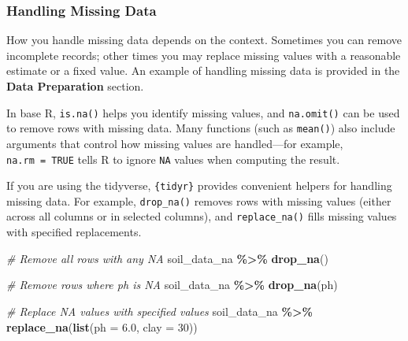 \documentclass[
  10pt,
  b5paper,
  oneside]{book}
\newenvironment{Shaded}{\begin{snugshade}}{\end{snugshade}}
\newcommand{\AttributeTok}[1]{\textcolor[rgb]{0.13,0.29,0.53}{#1}}
\newcommand{\CommentTok}[1]{\textcolor[rgb]{0.56,0.35,0.01}{\textit{#1}}}
\newcommand{\ConstantTok}[1]{\textcolor[rgb]{0.56,0.35,0.01}{#1}}
\newcommand{\DecValTok}[1]{\textcolor[rgb]{0.00,0.00,0.81}{#1}}
\newcommand{\FloatTok}[1]{\textcolor[rgb]{0.00,0.00,0.81}{#1}}
\newcommand{\FunctionTok}[1]{\textcolor[rgb]{0.13,0.29,0.53}{\textbf{#1}}}
\newcommand{\NormalTok}[1]{#1}
\newcommand{\OtherTok}[1]{\textcolor[rgb]{0.56,0.35,0.01}{#1}}
\newcommand{\SpecialCharTok}[1]{\textcolor[rgb]{0.81,0.36,0.00}{\textbf{#1}}}
\begin{document}
\subsubsection{Handling Missing Data}\label{handle-NA}

How you handle missing data depends on the context. Sometimes you can remove incomplete records; other times you may replace missing values with a reasonable estimate or a fixed value. An example of handling missing data is provided in the \textbf{Data Preparation} section.

In base R, \texttt{is.na()} helps you identify missing values, and \texttt{na.omit()} can be used to remove rows with missing data. Many functions (such as \texttt{mean()}) also include arguments that control how missing values are handled---for example, \texttt{na.rm\ =\ TRUE} tells R to ignore \texttt{NA} values when computing the result.

\begin{Shaded}
\end{Shaded}

If you are using the tidyverse, \texttt{\{tidyr\}} provides convenient helpers for handling missing data. For example, \texttt{drop\_na()} removes rows with missing values (either across all columns or in selected columns), and \texttt{replace\_na()} fills missing values with specified replacements.

\begin{Shaded}
\begin{Highlighting}[]
\CommentTok{\# Remove all rows with any NA}
\NormalTok{soil\_data\_na }\SpecialCharTok{\%\textgreater{}\%}
  \FunctionTok{drop\_na}\NormalTok{()}

\CommentTok{\# Remove rows where ph is NA}
\NormalTok{soil\_data\_na }\SpecialCharTok{\%\textgreater{}\%}
  \FunctionTok{drop\_na}\NormalTok{(ph)}

\CommentTok{\# Replace NA values with specified values}
\NormalTok{soil\_data\_na }\SpecialCharTok{\%\textgreater{}\%}
  \FunctionTok{replace\_na}\NormalTok{(}\FunctionTok{list}\NormalTok{(}\AttributeTok{ph =} \FloatTok{6.0}\NormalTok{, }\AttributeTok{clay =} \DecValTok{30}\NormalTok{))}
\end{Highlighting}
\end{Shaded}
\end{document}
